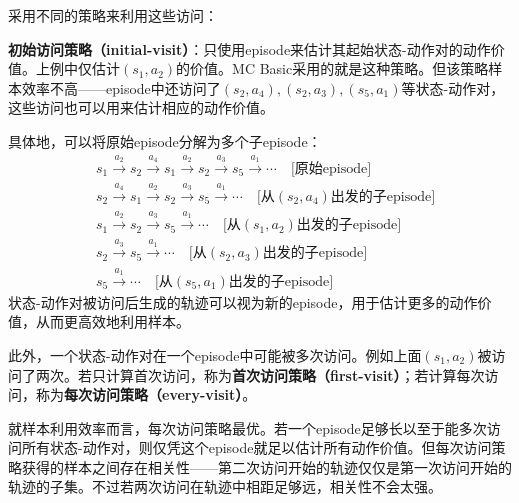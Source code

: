 \documentclass[UTF8]{article}
\begin{document}
采用不同的策略来利用这些访问：

\textbf{初始访问策略（initial-visit）}：只使用episode来估计其起始状态-动作对的动作价值。上例中仅估计$(s_1, a_2)$的价值。MC Basic采用的就是这种策略。但该策略样本效率不高——episode中还访问了$(s_2, a_4), (s_2, a_3), (s_5, a_1)$等状态-动作对，这些访问也可以用来估计相应的动作价值。

具体地，可以将原始episode分解为多个子episode：
\begin{align*}
    & s_1 \xrightarrow{a_2} s_2 \xrightarrow{a_4} s_1 \xrightarrow{a_2} s_2 \xrightarrow{a_3} s_5 \xrightarrow{a_1} \cdots \quad \text{[原始episode]} \\
    & s_2 \xrightarrow{a_4} s_1 \xrightarrow{a_2} s_2 \xrightarrow{a_3} s_5 \xrightarrow{a_1} \cdots \quad \text{[从$(s_2, a_4)$出发的子episode]} \\
    & s_1 \xrightarrow{a_2} s_2 \xrightarrow{a_3} s_5 \xrightarrow{a_1} \cdots \quad \text{[从$(s_1, a_2)$出发的子episode]} \\
    & s_2 \xrightarrow{a_3} s_5 \xrightarrow{a_1} \cdots \quad \text{[从$(s_2, a_3)$出发的子episode]} \\
    & s_5 \xrightarrow{a_1} \cdots \quad \text{[从$(s_5, a_1)$出发的子episode]}
\end{align*}
状态-动作对被访问后生成的轨迹可以视为新的episode，用于估计更多的动作价值，从而更高效地利用样本。

此外，一个状态-动作对在一个episode中可能被多次访问。例如上面$(s_1, a_2)$被访问了两次。若只计算首次访问，称为\textbf{首次访问策略（first-visit）}；若计算每次访问，称为\textbf{每次访问策略（every-visit）}。

就样本利用效率而言，每次访问策略最优。若一个episode足够长以至于能多次访问所有状态-动作对，则仅凭这个episode就足以估计所有动作价值。但每次访问策略获得的样本之间存在相关性——第二次访问开始的轨迹仅仅是第一次访问开始的轨迹的子集。不过若两次访问在轨迹中相距足够远，相关性不会太强。
\end{document}
